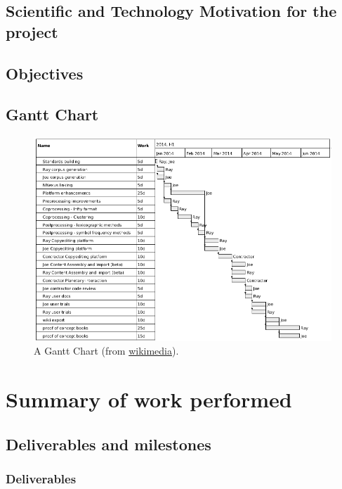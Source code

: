 \documentclass{ani-intermediate}
\begin{document}
\section{Scientific and Technology Motivation for the project}
\section{Objectives}
\section{Gantt Chart}

\begin{figure}[!htp]
  \includegraphics[width=1\textwidth]{images/gantt.png}
  \caption{A Gantt Chart (from \href{https://commons.wikimedia.org/wiki/File:Planetmathbooks_gantt.png}{wikimedia}).}
\end{figure}

\chapter{Summary of work performed}
\lipsum[5-9]


  \section{Deliverables and milestones}
  \subsection{Deliverables}
  \lipsum[10-12]
\end{document}
